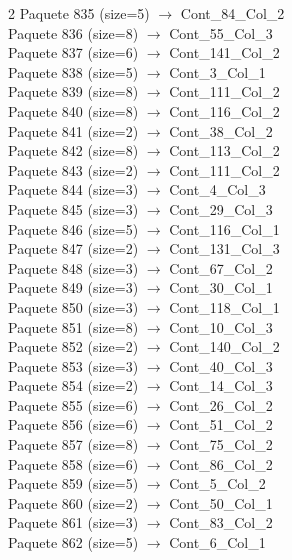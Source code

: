 \begin{multicols}{2}
Paquete 835 (size=5) $\rightarrow$ Cont\_84\_Col\_2\\
Paquete 836 (size=8) $\rightarrow$ Cont\_55\_Col\_3\\
Paquete 837 (size=6) $\rightarrow$ Cont\_141\_Col\_2\\
Paquete 838 (size=5) $\rightarrow$ Cont\_3\_Col\_1\\
Paquete 839 (size=8) $\rightarrow$ Cont\_111\_Col\_2\\
Paquete 840 (size=8) $\rightarrow$ Cont\_116\_Col\_2\\
Paquete 841 (size=2) $\rightarrow$ Cont\_38\_Col\_2\\
Paquete 842 (size=8) $\rightarrow$ Cont\_113\_Col\_2\\
Paquete 843 (size=2) $\rightarrow$ Cont\_111\_Col\_2\\
Paquete 844 (size=3) $\rightarrow$ Cont\_4\_Col\_3\\
Paquete 845 (size=3) $\rightarrow$ Cont\_29\_Col\_3\\
Paquete 846 (size=5) $\rightarrow$ Cont\_116\_Col\_1\\
Paquete 847 (size=2) $\rightarrow$ Cont\_131\_Col\_3\\
Paquete 848 (size=3) $\rightarrow$ Cont\_67\_Col\_2\\
Paquete 849 (size=3) $\rightarrow$ Cont\_30\_Col\_1\\
Paquete 850 (size=3) $\rightarrow$ Cont\_118\_Col\_1\\
Paquete 851 (size=8) $\rightarrow$ Cont\_10\_Col\_3\\
Paquete 852 (size=2) $\rightarrow$ Cont\_140\_Col\_2\\
Paquete 853 (size=3) $\rightarrow$ Cont\_40\_Col\_3\\
Paquete 854 (size=2) $\rightarrow$ Cont\_14\_Col\_3\\
Paquete 855 (size=6) $\rightarrow$ Cont\_26\_Col\_2\\
Paquete 856 (size=6) $\rightarrow$ Cont\_51\_Col\_2\\
Paquete 857 (size=8) $\rightarrow$ Cont\_75\_Col\_2\\
Paquete 858 (size=6) $\rightarrow$ Cont\_86\_Col\_2\\
Paquete 859 (size=5) $\rightarrow$ Cont\_5\_Col\_2\\
Paquete 860 (size=2) $\rightarrow$ Cont\_50\_Col\_1\\
Paquete 861 (size=3) $\rightarrow$ Cont\_83\_Col\_2\\
Paquete 862 (size=5) $\rightarrow$ Cont\_6\_Col\_1\\

\end{multicols}
